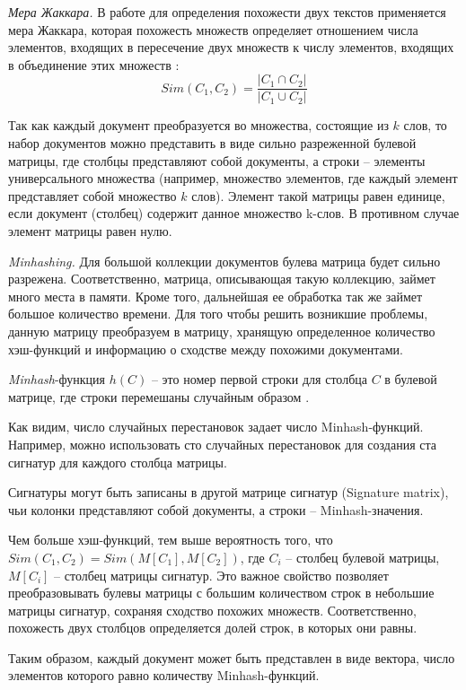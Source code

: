 \textit{Мера Жаккара.} В работе для определения похожести двух текстов применяется мера Жаккара, которая похожесть множеств определяет отношением числа элементов, входящих в пересечение двух множеств к числу элементов, входящих в объединение этих множеств \cite{SingthongchaiNiwattanakul}:
\[
\textit{Sim}(C_1, C_2) = \frac{\lvert C_1 \cap C_2\rvert}{\lvert C_1 \cup C_2\rvert}
\]

Так как каждый документ преобразуется во множества, состоящие из \(k\) слов, то набор документов можно представить в виде сильно разреженной булевой матрицы, где столбцы представляют собой документы, а строки -- элементы универсального множества (например, множество элементов, где каждый элемент представляет собой множество \(k\) слов). Элемент такой матрицы равен единице, если документ (столбец) содержит данное множество k-слов. В противном случае элемент матрицы равен нулю.

\textit{Minhashing.} Для большой коллекции документов булева матрица будет сильно разрежена. Соответственно, матрица, описывающая такую коллекцию, займет много места в памяти. Кроме того, дальнейшая ее обработка так же займет большое количество времени. Для того чтобы решить возникшие проблемы, данную матрицу преобразуем в матрицу, хранящую определенное количество хэш-функций и информацию о сходстве между похожими документами.

\textit{Minhash}-функция \(h(C)\) -- это номер первой строки для столбца \(C\) в булевой матрице, где строки перемешаны случайным образом \cite{ChumPerdochMatas}.

Как видим, число случайных перестановок задает число Minhash-функций. Например, можно использовать сто случайных перестановок для создания ста сигнатур для каждого столбца матрицы.

Сигнатуры могут быть записаны в другой матрице сигнатур (Signature matrix), чьи колонки представляют собой документы, а строки -- Minhash-значения.

Чем больше хэш-функций, тем выше вероятность того, что \(\textit{Sim}(C_1, C_2) = \textit{Sim}(M[C_1], M[C_2])\), где \(C_i\) -- столбец булевой матрицы, \(M[C_i]\) -- столбец матрицы сигнатур. Это важное свойство позволяет преобразовывать булевы матрицы с большим количеством строк в небольшие матрицы сигнатур, сохраняя сходство похожих множеств. Соответственно, похожесть двух столбцов определяется долей строк, в которых они равны.

Таким образом, каждый документ может быть представлен в виде вектора, число элементов которого равно количеству Minhash-функций.

